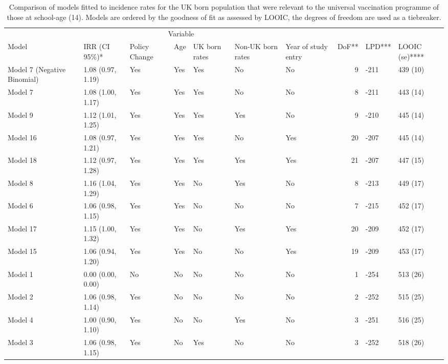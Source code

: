 \documentclass[11pt,twoside]{bristolthesis}
\begin{document}
\begin{landscape}
\begin{table}[!h]
  \caption[Comparison of models fitted to incidence rates for the UK born population that were relevant to the universal vaccination programme of those at school-age (14).]{\label{tab:07-summary-universal-ukborn}Comparison of models fitted to incidence rates for the UK born population that were relevant to the universal vaccination programme of those at school-age (14). Models are ordered by the goodness of fit as assessed by LOOIC, the degrees of freedom are used as a tiebreaker.}
  \centering
  \fontsize{8}{10}\selectfont
  \begin{tabular}{>{\raggedright\arraybackslash}p{3cm}llllllrll}
  \toprule
  \multicolumn{2}{c}{ } & \multicolumn{5}{c}{Variable} & \multicolumn{3}{c}{ } \\
  \cmidrule(l{3pt}r{3pt}){3-7}
  Model & IRR (CI 95\%)* & Policy Change & Age & UK born rates & Non-UK born rates & Year of study entry & DoF** & LPD*** & LOOIC (se)****\\
  \midrule
  Model 7 (Negative Binomial) & 1.08 (0.97, 1.19) & Yes & Yes & Yes & No & No & 9 & -211 & 439 (10)\\
  Model 7 & 1.08 (1.00, 1.17) & Yes & Yes & Yes & No & No & 8 & -211 & 443 (14)\\
  Model 9 & 1.12 (1.01, 1.25) & Yes & Yes & Yes & Yes & No & 9 & -210 & 445 (14)\\
  Model 16 & 1.08 (0.97, 1.21) & Yes & Yes & Yes & No & Yes & 20 & -207 & 445 (14)\\
  Model 18 & 1.12 (0.97, 1.28) & Yes & Yes & Yes & Yes & Yes & 21 & -207 & 447 (15)\\
  \addlinespace
  Model 8 & 1.16 (1.04, 1.29) & Yes & Yes & No & Yes & No & 8 & -213 & 449 (17)\\
  Model 6 & 1.06 (0.98, 1.15) & Yes & Yes & No & No & No & 7 & -215 & 452 (17)\\
  Model 17 & 1.15 (1.00, 1.32) & Yes & Yes & No & Yes & Yes & 20 & -209 & 452 (17)\\
  Model 15 & 1.06 (0.94, 1.20) & Yes & Yes & No & No & Yes & 19 & -209 & 453 (17)\\
  Model 1 & 0.00 (0.00, 0.00) & No & No & No & No & No & 1 & -254 & 513 (26)\\
  \addlinespace
  Model 2 & 1.06 (0.98, 1.14) & Yes & No & No & No & No & 2 & -252 & 515 (25)\\
  Model 4 & 1.00 (0.90, 1.10) & Yes & No & No & Yes & No & 3 & -251 & 516 (25)\\
  Model 3 & 1.06 (0.98, 1.15) & Yes & No & Yes & No & No & 3 & -252 & 518 (26)\\

\end{tabular}
\end{table}
\end{landscape}
\end{document}
